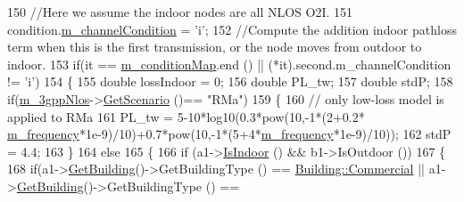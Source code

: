 \begin{DoxyCode}
150                         \textcolor{comment}{//Here we assume the indoor nodes are all NLOS O2I.}
151                         condition.\hyperlink{structchannelCondition_a1fbbec1a89c5da0961efaca304ade4d1}{m\_channelCondition} = \textcolor{charliteral}{'i'};
152                         \textcolor{comment}{//Compute the addition indoor pathloss term when this is the first transmission, or
       the node moves from outdoor to indoor.}
153                         \textcolor{keywordflow}{if}(it == \hyperlink{classns3_1_1MmWave3gppBuildingsPropagationLossModel_a18b00c0130a2924ec13a7885543fc569}{m\_conditionMap}.end () || (*it).second.m\_channelCondition != \textcolor{charliteral}{
      'i'})
154                         \{
155                                 \textcolor{keywordtype}{double} lossIndoor = 0;
156                                 \textcolor{keywordtype}{double} PL\_tw;
157                                 \textcolor{keywordtype}{double} stdP;
158                                 \textcolor{keywordflow}{if}(\hyperlink{classns3_1_1MmWave3gppBuildingsPropagationLossModel_a18ac2d667b12fa593c0ea044ad05af82}{m\_3gppNlos}->\hyperlink{classMmWave3gppPropagationLossModel_ae092a58d42801c732956d64e0fe250eb}{GetScenario} ()== \textcolor{stringliteral}{"RMa"})
159                                 \{
160                                         \textcolor{comment}{// only low-loss model is applied to RMa}
161                                         PL\_tw = 5-10*log10(0.3*pow(10,-1*(2+0.2*
      \hyperlink{classns3_1_1MmWave3gppBuildingsPropagationLossModel_ad7de82f89dfd910f127ce775fec14898}{m\_frequency}*1e-9)/10)+0.7*pow(10,-1*(5+4*\hyperlink{classns3_1_1MmWave3gppBuildingsPropagationLossModel_ad7de82f89dfd910f127ce775fec14898}{m\_frequency}*1e-9)/10));
162                                         stdP = 4.4;
163                                 \}
164                                 \textcolor{keywordflow}{else}
165                                 \{
166                                         \textcolor{keywordflow}{if} (a1->\hyperlink{classns3_1_1MobilityBuildingInfo_a2bba20054cc48efcca2d5e0c46f8171c}{IsIndoor} () && b1->IsOutdoor ())
167                                         \{
168                                                 \textcolor{keywordflow}{if}(a1->\hyperlink{classns3_1_1MobilityBuildingInfo_a15d4ac25e557d51b356610354c70c6fb}{GetBuilding}()->GetBuildingType () == 
      \hyperlink{classns3_1_1Building_af7f3940d00690b70af02310575d94ef3aa2daecca877283b8bb46a201393dcd01}{Building::Commercial} || a1->\hyperlink{classns3_1_1MobilityBuildingInfo_a15d4ac25e557d51b356610354c70c6fb}{GetBuilding}()->GetBuildingType () == 

\end{DoxyCode}
